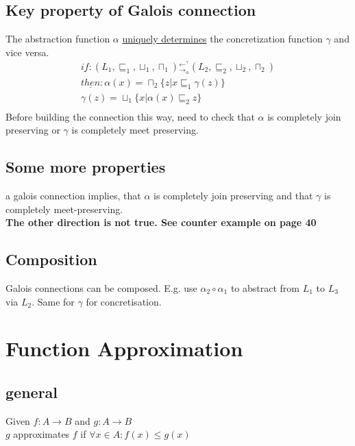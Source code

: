 \subsection{Key property of Galois connection}
The abstraction function $\alpha$ \underline{uniquely determines} the concretization function $\gamma$ and vice versa.\\
\begin{equation}
\label{eq:galois_key_property}
\begin{split}
\underline{if}: (L_1,\sqsubseteq_1,\sqcup_1,\sqcap_1) {}_{\to_{\alpha}}^ {\gets^{\gamma}} (L_2,\sqsubseteq_2,\sqcup_2,\sqcap_2) \\ 
\underline{then}: \alpha(x) = \sqcap_2\{z | x \sqsubseteq_1 \gamma(z)\} \\
\gamma(z) = \sqcup_1\{x | \alpha(x) \sqsubseteq_2 z\} \\
\end{split}
\end{equation}
Before building the connection this way, need to check that $\alpha$ is completely join preserving or $\gamma$ is completely meet preserving.
\subsection{Some more properties}
a galois connection implies, that $\alpha$ is completely join preserving and that $\gamma$ is completely meet-preserving.\\
\textbf{The other direction is not true. See counter example on page 40}
\subsection{Composition}
Galois connections can be composed. E.g. use $\alpha_2 \circ \alpha_1$ to abstract from $L_1$ to $L_3$ via $L_2$. Same for $\gamma$ for concretisation.
\section{Function Approximation}
\subsection{general}
Given $f:A \to B$ and $g: A \to B$ \\ $g$ approximates $f$ if $\forall x \in A:f(x) \leq g(x)$
